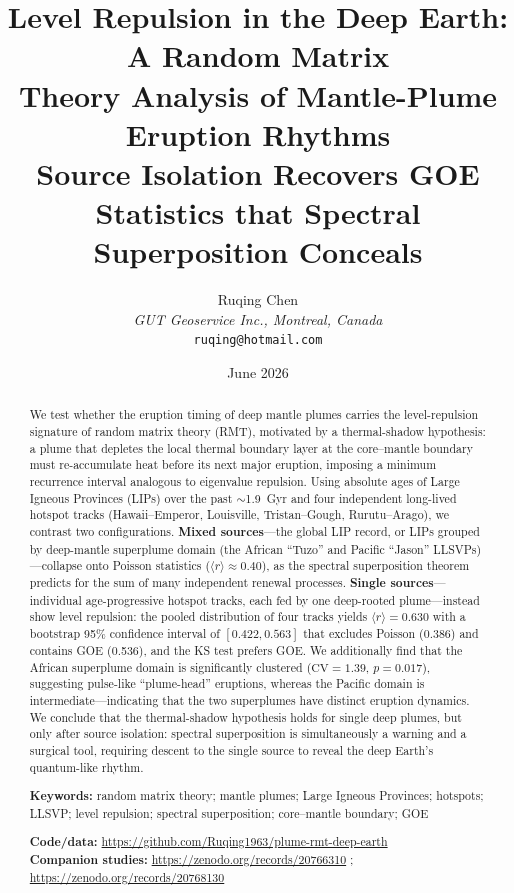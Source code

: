 \documentclass[12pt,a4paper]{article}
\title{\textbf{Level Repulsion in the Deep Earth: A Random Matrix\\
Theory Analysis of Mantle-Plume Eruption Rhythms}\\[4pt]
\large Source Isolation Recovers GOE Statistics that Spectral\\
Superposition Conceals}
\author{Ruqing Chen\\
\textit{GUT Geoservice Inc., Montreal, Canada}\\
\texttt{ruqing@hotmail.com}}
\date{June 2026}
\begin{document}
\maketitle

\begin{abstract}
We test whether the eruption timing of deep mantle plumes carries the level-repulsion signature of random matrix theory (RMT), motivated by a thermal-shadow hypothesis: a plume that depletes the local thermal boundary layer at the core--mantle boundary must re-accumulate heat before its next major eruption, imposing a minimum recurrence interval analogous to eigenvalue repulsion. Using absolute ages of Large Igneous Provinces (LIPs) over the past $\sim$1.9~Gyr and four independent long-lived hotspot tracks (Hawaii--Emperor, Louisville, Tristan--Gough, Rurutu--Arago), we contrast two configurations. \textbf{Mixed sources}---the global LIP record, or LIPs grouped by deep-mantle superplume domain (the African ``Tuzo'' and Pacific ``Jason'' LLSVPs)---collapse onto Poisson statistics ($\langle r\rangle\approx0.40$), as the spectral superposition theorem predicts for the sum of many independent renewal processes. \textbf{Single sources}---individual age-progressive hotspot tracks, each fed by one deep-rooted plume---instead show level repulsion: the pooled distribution of four tracks yields $\langle r\rangle=0.630$ with a bootstrap 95\% confidence interval of $[0.422,0.563]$ that excludes Poisson (0.386) and contains GOE (0.536), and the KS test prefers GOE. We additionally find that the African superplume domain is significantly clustered ($\mathrm{CV}=1.39$, $p=0.017$), suggesting pulse-like ``plume-head'' eruptions, whereas the Pacific domain is intermediate---indicating that the two superplumes have distinct eruption dynamics. We conclude that the thermal-shadow hypothesis holds for single deep plumes, but only after source isolation: spectral superposition is simultaneously a warning and a surgical tool, requiring descent to the single source to reveal the deep Earth's quantum-like rhythm.

\medskip
\noindent\textbf{Keywords:} random matrix theory; mantle plumes; Large Igneous Provinces; hotspots; LLSVP; level repulsion; spectral superposition; core--mantle boundary; GOE

\medskip
\noindent\textbf{Code/data:} \url{https://github.com/Ruqing1963/plume-rmt-deep-earth}\\
\textbf{Companion studies:} \url{https://zenodo.org/records/20766310} ; \url{https://zenodo.org/records/20768130}
\end{abstract}
\end{document}
